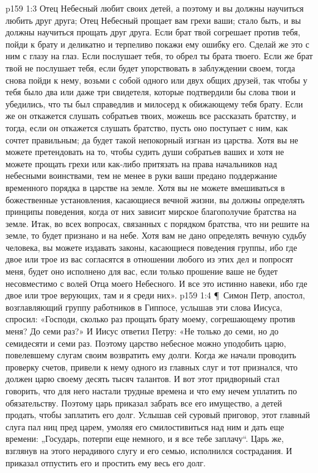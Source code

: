 \vs p159 1:3 Отец Небесный любит своих детей, а поэтому и вы должны научиться любить друг друга; Отец Небесный прощает вам грехи ваши; стало быть, и вы должны научиться прощать друг друга. Если брат твой согрешает против тебя, пойди к брату и деликатно и терпеливо покажи ему ошибку его. Сделай же это с ним с глазу на глаз. Если послушает тебя, то обрел ты брата твоего. Если же брат твой не послушает тебя, если будет упорствовать в заблуждении своем, тогда снова пойди к нему, возьми с собой одного или двух общих друзей, так чтобы у тебя было два или даже три свидетеля, которые подтвердили бы слова твои и убедились, что ты был справедлив и милосерд к обижающему тебя брату. Если же он откажется слушать собратьев твоих, можешь все рассказать братству, и тогда, если он откажется слушать братство, пусть оно поступает с ним, как сочтет правильным; да будет такой непокорный изгнан из царства. Хотя вы не можете претендовать на то, чтобы судить души собратьев ваших и хотя не можете прощать грехи или как\hyp{}либо притязать на права начальников над небесными воинствами, тем не менее в руки ваши предано поддержание временного порядка в царстве на земле. Хотя вы не можете вмешиваться в божественные установления, касающиеся вечной жизни, вы должны определять принципы поведения, когда от них зависит мирское благополучие братства на земле. Итак, во всех вопросах, связанных с порядком братства, что ни решите на земле, то будет признано и на небе. Хотя вам не дано определять вечную судьбу человека, вы можете издавать законы, касающиеся поведения группы, ибо где двое или трое из вас согласятся в отношении любого из этих дел и попросят меня, будет оно исполнено для вас, если только прошение ваше не будет несовместимо с волей Отца моего Небесного. И все это истинно навеки, ибо где двое или трое верующих, там и я среди них».
\vs p159 1:4 \P\ Симон Петр, апостол, возглавляющий группу работников в Гиппосе, услышав эти слова Иисуса, спросил: «Господи, сколько раз прощать брату моему, согрешающему против меня? До семи раз?» И Иисус ответил Петру: «Не только до семи, но до семидесяти и семи раз. Поэтому царство небесное можно уподобить царю, повелевшему слугам своим возвратить ему долги. Когда же начали проводить проверку счетов, привели к нему одного из главных слуг и тот признался, что должен царю своему десять тысяч талантов. И вот этот придворный стал говорить, что для него настали трудные времена и что ему нечем уплатить по обязательству. Поэтому царь приказал забрать все его имущество, а детей продать, чтобы заплатить его долг. Услышав сей суровый приговор, этот главный слуга пал ниц пред царем, умоляя его смилостивиться над ним и дать еще времени: „Государь, потерпи еще немного, и я все тебе заплачу“. Царь же, взглянув на этого нерадивого слугу и его семью, исполнился сострадания. И приказал отпустить его и простить ему весь его долг.
